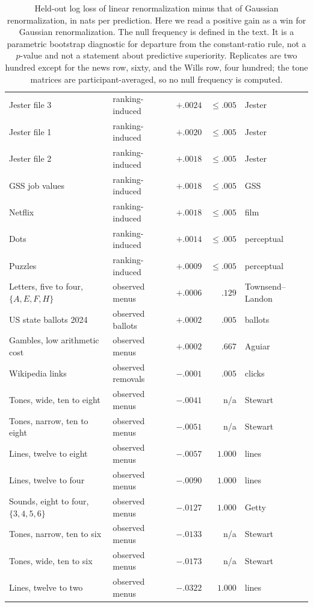 \documentclass[11pt]{article}
\begin{document}
\begin{table}[!t]
\begin{tabular}{llrrl}
Jester file 3 & ranking-induced & $+.0024$ & $\le .005$ & Jester \\
Jester file 1 & ranking-induced & $+.0020$ & $\le .005$ & Jester \\
Jester file 2 & ranking-induced & $+.0018$ & $\le .005$ & Jester \\
GSS job values & ranking-induced & $+.0018$ & $\le .005$ & GSS \\
Netflix & ranking-induced & $+.0018$ & $\le .005$ & film \\
Dots & ranking-induced & $+.0014$ & $\le .005$ & perceptual \\
Puzzles & ranking-induced & $+.0009$ & $\le .005$ & perceptual \\
Letters, five to four, $\{A,E,F,H\}$ & observed menus & $+.0006$ & $.129$ & Townsend--Landon \\
US state ballots 2024 & observed ballots & $+.0002$ & $.005$ & ballots \\
Gambles, low arithmetic cost & observed menus & $+.0002$ & $.667$ & Aguiar \\
\midrule
Wikipedia links & observed removals & $-.0001$ & $.005$ & clicks \\
Tones, wide, ten to eight & observed menus & $-.0041$ & n/a & Stewart \\
Tones, narrow, ten to eight & observed menus & $-.0051$ & n/a & Stewart \\
Lines, twelve to eight & observed menus & $-.0057$ & $1.000$ & lines\footnotemark[8] \\
Lines, twelve to four & observed menus & $-.0090$ & $1.000$ & lines\footnotemark[8] \\
Sounds, eight to four, $\{3,4,5,6\}$ & observed menus & $-.0127$ & $1.000$ & Getty \\
Tones, narrow, ten to six & observed menus & $-.0133$ & n/a & Stewart \\
Tones, wide, ten to six & observed menus & $-.0173$ & n/a & Stewart \\
Lines, twelve to two & observed menus & $-.0322$ & $1.000$ & lines\footnotemark[8] \\
\bottomrule
\end{tabular}
\caption{Held-out log loss of linear renormalization minus that of Gaussian renormalization, in
nats per prediction. Here we read a positive gain as a win for Gaussian renormalization. The null
frequency is defined in the text. It is a parametric bootstrap diagnostic for departure from the
constant-ratio rule, not a $p$-value and not a statement about predictive superiority. Replicates are two hundred except for the news row, sixty, and the Wills
row, four hundred; the tone matrices are participant-averaged, so no null frequency is computed.}
\label{tab:scoreboard}
\end{table}
\end{document}
